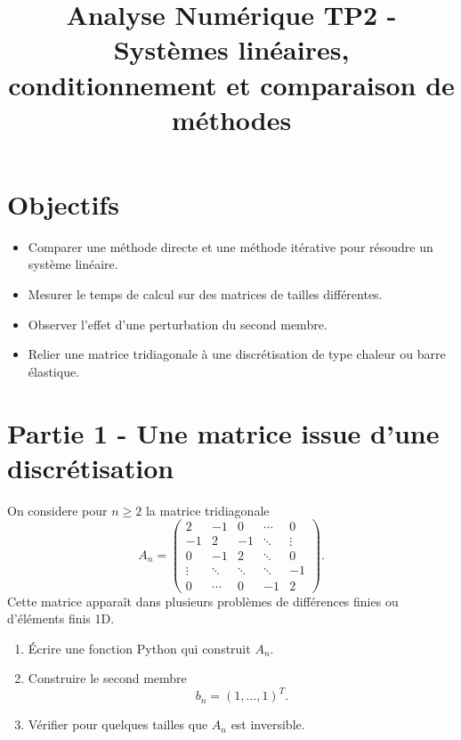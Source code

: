 
\usepackage{listings}

\lstset{
    basicstyle=\ttfamily\small,
    breaklines=true,
    frame=single,
    columns=fullflexible,
    keepspaces=true
}

\title{Analyse Numérique TP2 - Systèmes linéaires, conditionnement et comparaison de méthodes}

\author{}
\date{}


\sffamily
\maketitle

\section*{Objectifs}
\begin{itemize}
    \item Comparer une méthode directe et une méthode itérative pour résoudre un système linéaire.
    \item Mesurer le temps de calcul sur des matrices de tailles différentes.
    \item Observer l'effet d'une perturbation du second membre.
    \item Relier une matrice tridiagonale à une discrétisation de type chaleur ou barre élastique.
\end{itemize}

\section*{Partie 1 - Une matrice issue d'une discrétisation}
On considere pour $n\geq 2$ la matrice tridiagonale
\[
A_n=
\begin{pmatrix}
2 & -1 & 0 & \cdots & 0\\
-1 & 2 & -1 & \ddots & \vdots\\
0 & -1 & 2 & \ddots & 0\\
\vdots & \ddots & \ddots & \ddots & -1\\
0 & \cdots & 0 & -1 & 2
\end{pmatrix}.
\]
Cette matrice apparaît dans plusieurs problèmes de différences finies ou d'éléments finis 1D.

\begin{enumerate}
    \item Écrire une fonction Python qui construit $A_n$.

    \item Construire le second membre
    \[
    b_n=(1,\dots,1)^T.
    \]

    \item Vérifier pour quelques tailles que $A_n$ est inversible.
\end{enumerate}


